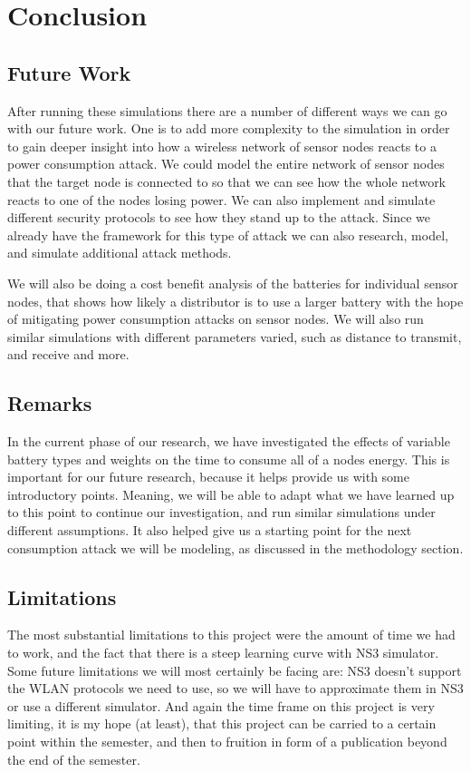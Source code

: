 \section{Conclusion}
\subsection{Future Work}
After running these simulations there are a number of different ways 
we can go with our future work.  One is to add more complexity to 
the simulation in order to gain deeper insight into how a wireless 
network of sensor nodes reacts to a power consumption attack.  We 
could model the entire network of sensor nodes that the target node 
is connected to so that we can see how the whole network reacts to 
one of the nodes losing power. We can also implement and simulate 
different security protocols to see how they stand up to the attack.  
Since we already have the framework for this type of attack we can 
also research, model, and simulate additional attack methods.

We will also be doing a cost benefit analysis of the batteries for individual sensor 
nodes, that shows how likely a distributor is to use a larger battery with the hope of
mitigating power consumption attacks on sensor nodes. We will also run 
similar simulations with different parameters varied, such as distance to transmit, and 
receive and more. 
 
\subsection{Remarks}
In the current phase of our research, we have investigated the effects of variable battery 
types and weights on the time to consume all of a nodes energy. This is important for our future research, 
because it helps provide us with some introductory points. Meaning, we will be able to adapt what we 
have learned up to this point to continue our investigation, and run similar simulations under 
different assumptions. It also helped give us a starting point for the next consumption attack 
we will be modeling, as discussed in the methodology section.  

\subsection{Limitations}
The most substantial limitations to this project were the amount of time we had to work, and the fact that 
there is a steep learning curve with NS3 simulator. Some future limitations we will most certainly be facing 
are: NS3 doesn't support the WLAN protocols we need to use, so we will have to approximate them in NS3 or use a 
different simulator. And again the time frame on this project is very limiting, it is my hope (at least), that 
this project can be carried to a certain point within the semester, and then to fruition in form of a publication 
beyond the end of the semester.